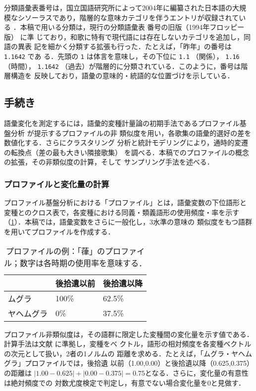 \documentclass[submit]{ipsj}
\renewcommand{\ref}{\cref}
\begin{document}
分類語彙表番号は，国立国語研究所によって2004年に編纂された日本語の大規
模なシソーラスであり，階層的な意味カテゴリを伴うエントリが収録されてい
る \cite{Asahara2022CHJWLSP}．本稿で用いる分類は，現行の分類語彙表
番号の旧版（1994年フロッピー版）\cite{nakano1994Bunruigoihyo} に準
じており，和歌に特有で現代語には存在しないカテゴリを追加し，同語の異表
記を細かく分類する拡張も行った．たとえば，「昨年」の番号は \texttt{1.1642} であ
る．先頭の \texttt{1} は体言を意味し，その下位に \texttt{1.1} （関係）， \texttt{1.16} （時間），
\texttt{1.1642} （過去）が階層的に分類されている．このように，番号は階層構造を
反映しており，語彙の意味的・統語的な位置づけを示している．
\subsection{手続き\label{orgeabf838}}
\label{sec:orge6fda82}
語彙変化を測定するには，語彙的変種計量論の初期手法であるプロファイル基
盤分析 \cite{Speelman2003Profilebased} が提示するプロファイルの非
類似度を用い，各歌集の語彙的選好の差を数値化する．さらにクラスタリング
分析と統計モデリングにより，通時的変遷の転換点（差の最も大きい隣接歌集）
を調べる．本稿でのプロファイルの概念の拡張，その非類似度の計算，そして
サンプリング手法を述べる．
\subsubsection{プロファイルと変化量の計算\label{org87c5952}}
\label{sec:orga153f68}
プロファイル基盤分析における「プロファイル」とは，語彙変数の下位語形と
変種とのクロス表で，各変種における同義・類義語形の使用頻度・率を示す
（\ref{tab:orga8c5f61}）．本稿では，語彙変数をさらに一般化し，3水準の意味の
類似度をもつ語群を用いてプロファイルを作成する．

\begin{table}[t]
\caption{\label{tab:orga8c5f61}プロファイルの例：「葎」のプロファイル；数字は各時期の使用率を意味する．}
\centering
\begin{tabular}{lll}
 & 後拾遺以前 & 後拾遺以降\\
\hline
ムグラ & 100\% & 62.5\%\\
ヤヘムグラ & 0\% & 37.5\%\\
\end{tabular}
\end{table}

プロファイル非類似度は，その語群に限定した変種間の変化量を示す値である．
計算手法は文献 \cite{Speelman2003Profilebased}に準拠し，変種をベ
クトル，語形の相対頻度を各変種ベクトルの次元として扱い，2者の1ノルムの
距離を求める．たとえば，「ムグラ・ヤヘムグラ」プロファイルでは，後拾遺
以前（1.00,0.00）と後拾遺以降（0.625,0.375）の距離は \(|1.00 -
0.625|+|0.00-0.375|=0.75\)となる．さらに，変化量の有意性は絶対頻度での
対数尤度検定で判定し，有意でない場合変化量を0と見做す．
\end{document}
